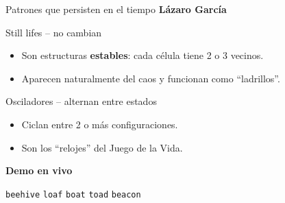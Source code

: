 \documentclass[10pt,aspectratio=169]{beamer}
\newcommand{\demo}[1]{\textcolor{democolor}{\texttt{#1}}}
\begin{document}
\begin{frame}{Patrones que persisten en el tiempo}
  \textbf{Lázaro García}

  \vspace{0.4cm}

  \begin{block}{Still lifes -- no cambian}
    \begin{itemize}
      \item Son estructuras \textbf{estables}: cada célula tiene 2 o 3 vecinos.
      \item Aparecen naturalmente del caos y funcionan como ``ladrillos''.
    \end{itemize}
  \end{block}

  \begin{block}{Osciladores -- alternan entre estados}
    \begin{itemize}
      \item Ciclan entre 2 o más configuraciones.
      \item Son los ``relojes'' del Juego de la Vida.
    \end{itemize}
  \end{block}

  \vspace{0.3cm}

  \begin{center}
    \textbf{Demo en vivo}

    \demo{beehive} \quad \demo{loaf} \quad \demo{boat}
    \quad \demo{toad} \quad \demo{beacon}
  \end{center}
\end{frame}
\end{document}
